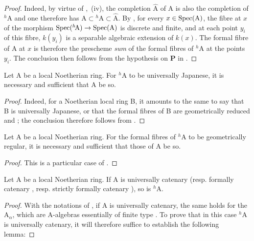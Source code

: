 \begin{proof}
Indeed, by virtue of ,~(iv), the completion $\hat{\mathrm{A}}$ of A is also the completion of ${}^h\!\mathrm{A}$ and one therefore has $\mathrm{A}\subset{}^h\!\mathrm{A}\subset\hat{\mathrm{A}}$.
By , for every $x\in\operatorname{Spec}(\mathrm{A})$, the fibre at $x$ of the morphism $\operatorname{Spec}({}^h\!\mathrm{A})\to\operatorname{Spec}(\mathrm{A})$ is discrete and finite, and at each point $y_i$ of this fibre, $k(y_i)$ is a separable algebraic extension of $k(x)$.
The formal fibre of A at $x$ is therefore the prescheme \emph{sum} of the formal fibres of ${}^h\!\mathrm{A}$ at the points $y_i$.
The conclusion then follows from the hypothesis on $\boldsymbol{P}$ in .
\end{proof}

\begin{corollary}[18.7.3]
\label{IV.18.7.3}
Let $\mathrm{A}$ be a local Noetherian ring.
For ${}^h\!\mathrm{A}$ to be universally Japanese, it is necessary and sufficient that A be so.
\end{corollary}

\begin{proof}
Indeed, for a Noetherian local ring B, it amounts to the same to say that B is universally Japanese, or that the formal fibres of B are geometrically reduced  and ;
the conclusion therefore follows from .
\end{proof}

\begin{corollary}[18.7.4]
\label{IV.18.7.4}
Let $\mathrm{A}$ be a local Noetherian ring.
For the formal fibres of ${}^h\!\mathrm{A}$ to be geometrically regular, it is necessary and sufficient that those of A be so.
\end{corollary}

\begin{proof}
This is a particular case of .
\end{proof}

\begin{proposition}[18.7.5]
\label{IV.18.7.5}
Let $\mathrm{A}$ be a local Noetherian ring.
If A is universally catenary  (resp. formally catenary , resp. strictly formally catenary ), so is ${}^h\!\mathrm{A}$.
\end{proposition}

\begin{proof}
With the notations of , if A is universally catenary, the same holds for the $\mathrm{A}_\alpha$, which are A-algebras essentially of finite type .
To prove that in this case ${}^h\!\mathrm{A}$ is universally catenary, it will therefore suffice to establish the following lemma:
\end{proof}

